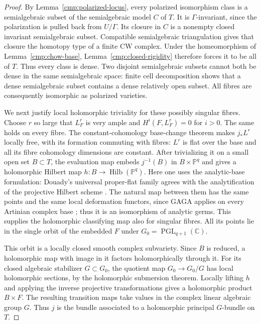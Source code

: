 \begin{proof}
By Lemma~\ref{cmp:polarized-locus}, every polarized isomorphism class
is a semialgebraic subset of the semialgebraic model $C$ of $T$.
It is $\Gamma$-invariant, since the polarization is pulled back from
$U/\Gamma$.  Its closure in $C$ is a nonempty closed invariant
semialgebraic subset.  Compatible semialgebraic triangulation
\cite[\S3, Theorem~4]{Lojasiewicz1964} gives that closure the
homotopy type of a finite CW complex.  Under the homeomorphism
of Lemma~\ref{cmp:chow-base}, Lemma~\ref{cmp:closed-rigidity} therefore
forces it to be all of $T$.  Thus every class is dense.  Two disjoint
semialgebraic subsets cannot both be dense in the same semialgebraic
space: finite cell decomposition shows that a dense semialgebraic
subset contains a dense relatively open subset.  All fibres are
consequently isomorphic as polarized varieties.

We next justify local holomorphic triviality for these possibly
singular fibres.  Choose $r$ so large that $L_F^r$ is very ample and
$H^i(F,L_F^r)=0$ for $i>0$.  The same holds on every fibre.  The constant-cohomology base-change theorem
\cite[\S7, Satz~5]{Grauert1960} makes $j_*L^r$ locally free, with
its formation commuting with fibres: $L^r$ is flat over the base
and all its fibre cohomology dimensions are constant.  After trivializing it on a
small open set $B\subset T$, the evaluation map embeds
$j^{-1}(B)$ in $B\times\mathbb P^q$ and gives a holomorphic Hilbert
map $h:B\to\operatorname{Hilb}(\mathbb P^q)$.
Here one uses the analytic-base formulation: Douady's universal
proper-flat family \cite[\S\S9.7--9.8, Theorems~1--2]{Douady1966} agrees
with the analytification of the projective Hilbert scheme
\cite[\S3, Theorem~3.2]{Grothendieck1961}. The natural map
between them has the same points and the same local deformation
functors, since GAGA applies on every Artinian complex base
\cite[Expos\'e~XII, Theorem~4.4]{SGA1};
thus it is an isomorphism of analytic germs. This supplies the
holomorphic classifying map also for singular fibres.  All its points lie
in the single orbit of the embedded $F$ under
$G_0=\operatorname{PGL}_{q+1}(\mathbb C)$.

This orbit is a locally closed smooth complex subvariety.  Since
$B$ is reduced, a holomorphic map with image in it factors
holomorphically through it.  For its closed algebraic stabilizer
$G\subset G_0$, the quotient map $G_0\to G_0/G$ has local
holomorphic sections, by the holomorphic submersion theorem.
Locally lifting $h$ and applying the inverse projective
transformations gives a holomorphic product $B\times F$.
The resulting transition maps take values in the complex linear
algebraic group $G$.  Thus $j$ is the bundle associated to a
holomorphic principal $G$-bundle on $T$.


\end{proof}
